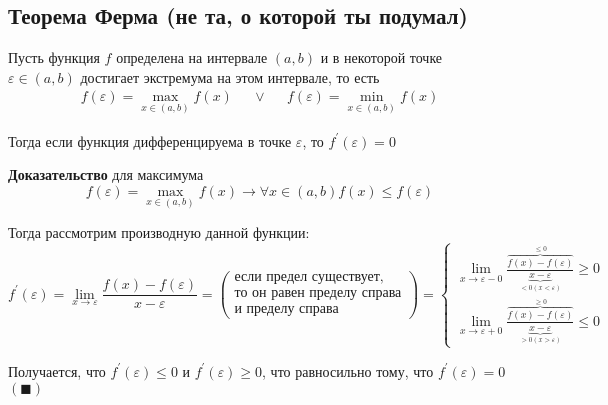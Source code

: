 \documentclass[class=article,a4paper,12pt,crop=false]{standalone}
\begin{document}
\subsection{Теорема Ферма (не та, о которой ты подумал)}

Пусть функция $f$ определена на интервале $(a, b)$ и в некоторой точке $\varepsilon \in (a, b)$
достигает экстремума на этом интервале, то есть
\begin{equation}
    \begin{aligned}
        f(\varepsilon) = \underset{x \in (a, b)}{\max} f(x)  & & \lor & &
        f(\varepsilon) = \underset{x \in (a, b)}{\min} f(x)
    \end{aligned}
\end{equation}

Тогда если функция дифференцируема в точке $\varepsilon$, то $f^{'}(\varepsilon) = 0$

\textbf{Доказательство} для максимума
\begin{equation}
    f(\varepsilon) = \underset{x \in (a, b)}{\max} f(x)
    \rightarrow \forall x \in (a, b) f(x) \leq f(\varepsilon)
\end{equation}

Тогда рассмотрим производную данной функции:
\begin{equation}
    f^{'}(\varepsilon) = \lim\limits_{x \rightarrow \varepsilon}\frac{f(x) - f(\varepsilon)}{x - \varepsilon} =
    \left(\begin{aligned}
        \text{если предел существует,} \:\:\: \\
        \text{то он равен пределу справа} \\
        \text{и пределу справа} \:\:\:\:\:\:\:\:\:
    \end{aligned}\right)
    = \begin{cases}
        \lim\limits_{x \rightarrow \varepsilon - 0}\frac{
            \overset{\leq 0}{\overbrace{f(x) - f(\varepsilon)}}
        }{\underset{< 0 (x < \varepsilon)}{\underbrace{x - \varepsilon}}} \geq 0 \\
        \lim\limits_{x \rightarrow \varepsilon + 0}\frac{
            \overset{\geq 0}{\overbrace{f(x) - f(\varepsilon)}}
        }{\underset{> 0 (x > \varepsilon)}{\underbrace{x - \varepsilon}}} \leq 0
    \end{cases}
\end{equation}

Получается, что $f^{'}(\varepsilon) \leq 0$ и $f^{'}(\varepsilon) \geq 0$, что равносильно тому, что $f^{'}(\varepsilon) = 0$ $(\blacksquare)$
\end{document}
